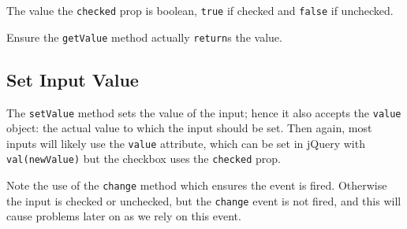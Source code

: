 \documentclass[10pt,]{krantz}
\makeatletter
\newenvironment{Shaded}{\begin{snugshade}}{\end{snugshade}}
\newcommand{\AttributeTok}[1]{\textcolor[rgb]{0.61,0.61,0.61}{#1}}
\newcommand{\CommentTok}[1]{\textcolor[rgb]{0.37,0.37,0.37}{\textit{#1}}}
\newcommand{\ControlFlowTok}[1]{\textcolor[rgb]{0.27,0.27,0.27}{\textbf{#1}}}
\newcommand{\DataTypeTok}[1]{\textcolor[rgb]{0.27,0.27,0.27}{#1}}
\newcommand{\KeywordTok}[1]{\textcolor[rgb]{0.27,0.27,0.27}{\textbf{#1}}}
\newcommand{\NormalTok}[1]{#1}
\newcommand{\OperatorTok}[1]{\textcolor[rgb]{0.43,0.43,0.43}{\textbf{#1}}}
\newcommand{\StringTok}[1]{\textcolor[rgb]{0.5,0.5,0.5}{#1}}
\newcommand{\VariableTok}[1]{\textcolor[rgb]{0,0,0}{#1}}
\newenvironment{kframe}{%
\medskip{}
\setlength{\fboxsep}{.8em}
 \def\at@end@of@kframe{}%
 \ifinner\ifhmode%
  \def\at@end@of@kframe{\end{minipage}}%
  \begin{minipage}{\columnwidth}%
 \fi\fi%
 \def\FrameCommand##1{\hskip\@totalleftmargin \hskip-\fboxsep
 \colorbox{shadecolor}{##1}\hskip-\fboxsep
     \hskip-\linewidth \hskip-\@totalleftmargin \hskip\columnwidth}%
 \MakeFramed {\advance\hsize-\width
   \@totalleftmargin\z@ \linewidth\hsize
   \@setminipage}}%
 {\par\unskip\endMakeFramed%
 \at@end@of@kframe}
\renewenvironment{Shaded}{\begin{kframe}}{\end{kframe}}
\newenvironment{rmdblock}[1]
  {
  \begin{itemize}
  \renewcommand{\labelitemi}{
    \raisebox{-.7\height}[0pt][0pt]{
      {\setkeys{Gin}{width=3em,keepaspectratio}\texttt{[image: images/\#1]}}
    }
  }
  \setlength{\fboxsep}{1em}
  \begin{kframe}
  \item
  }
  {
  \end{kframe}
  \end{itemize}
  }
\newenvironment{rmdnote}
  {\begin{rmdblock}{note}}
  {\end{rmdblock}}
\makeatother
\begin{document}
The value the \texttt{checked} prop is boolean, \texttt{true} if checked and \texttt{false} if unchecked.

\begin{rmdnote}
Ensure the \texttt{getValue} method actually \texttt{return}s the value.
\end{rmdnote}

\hypertarget{shiny-input-set-value}{%
\subsection{Set Input Value}\label{shiny-input-set-value}}

The \texttt{setValue} method sets the value of the input; hence it also accepts the \texttt{value} object: the actual value to which the input should be set. Then again, most inputs will likely use the \texttt{value} attribute, which can be set in jQuery with \texttt{val(newValue)} but the checkbox uses the \texttt{checked} prop.

\begin{Shaded}
\end{Shaded}

Note the use of the \texttt{change} method which ensures the event is fired. Otherwise the input is checked or unchecked, but the \texttt{change} event is not fired, and this will cause problems later on as we rely on this event.
\end{document}
